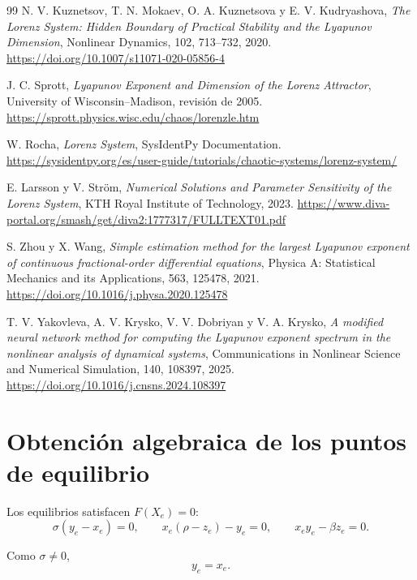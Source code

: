\documentclass[12pt,a4paper,oneside]{report}
\numberwithin{equation}{chapter}
\begin{document}
\begin{thebibliography}{99}
 N. V. Kuznetsov, T. N. Mokaev, O. A. Kuznetsova y E. V. Kudryashova, \emph{The Lorenz System: Hidden Boundary of Practical Stability and the Lyapunov Dimension}, Nonlinear Dynamics, 102, 713--732, 2020. \url{https://doi.org/10.1007/s11071-020-05856-4}

 J. C. Sprott, \emph{Lyapunov Exponent and Dimension of the Lorenz Attractor}, University of Wisconsin--Madison, revisión de 2005. \url{https://sprott.physics.wisc.edu/chaos/lorenzle.htm}

 W. Rocha, \emph{Lorenz System}, SysIdentPy Documentation. \url{https://sysidentpy.org/es/user-guide/tutorials/chaotic-systems/lorenz-system/}

 E. Larsson y V. Ström, \emph{Numerical Solutions and Parameter Sensitivity of the Lorenz System}, KTH Royal Institute of Technology, 2023. \url{https://www.diva-portal.org/smash/get/diva2:1777317/FULLTEXT01.pdf}

 S. Zhou y X. Wang, \emph{Simple estimation method for the largest Lyapunov exponent of continuous fractional-order differential equations}, Physica A: Statistical Mechanics and its Applications, 563, 125478, 2021. \url{https://doi.org/10.1016/j.physa.2020.125478}

 T. V. Yakovleva, A. V. Krysko, V. V. Dobriyan y V. A. Krysko, \emph{A modified neural network method for computing the Lyapunov exponent spectrum in the nonlinear analysis of dynamical systems}, Communications in Nonlinear Science and Numerical Simulation, 140, 108397, 2025. \url{https://doi.org/10.1016/j.cnsns.2024.108397}

\end{thebibliography}

\appendix{}

\chapter{Obtención algebraica de los puntos de equilibrio}
\label{app:equilibrios}

Los equilibrios satisfacen \(F(X_e)=0\):
\begin{equation}
    \sigma(y_e-x_e)=0,\qquad x_e(\rho-z_e)-y_e=0,\qquad x_ey_e-\beta z_e=0.
\end{equation}

Como \(\sigma\neq0\),
\begin{equation}
    y_e=x_e.
\end{equation}
\end{document}
